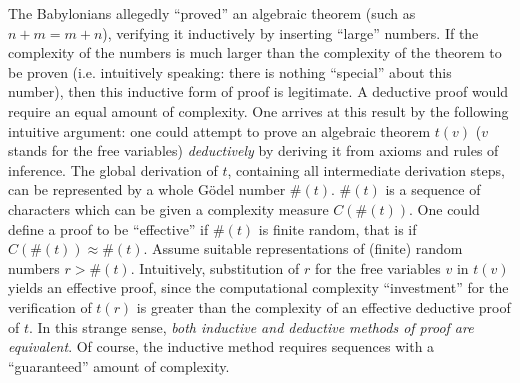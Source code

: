 \begin{thebibliography}{999}
The Babylonians allegedly ``proved'' an algebraic theorem
(such as $n+m=m+n$),
verifying it inductively by inserting ``large'' numbers.
If the complexity of the
numbers is much larger than the complexity of the theorem to be proven
(i.e. intuitively speaking: there is nothing ``special'' about
this number), then this inductive form of proof is legitimate.
A deductive proof would require an equal amount of complexity.
One arrives at this result by the
following intuitive argument:
one could attempt to prove an algebraic theorem $t(v)$ ($v$ stands for
the free variables) {\sl deductively} by deriving it from axioms and
rules of inference.
The global derivation of $t$,
containing all intermediate derivation steps,
can be represented by a whole G\"odel number $\# (t)$.
$\# (t)$ is a sequence of characters which can be given a
complexity measure $C(\# (t))$.
One could define a proof to be ``effective'' if $\# (t)$ is finite
random, that is if $C(\# (t)) \approx \# (t)$.
Assume suitable representations of (finite) random numbers $r>\# (t)$.
Intuitively, substitution of $r$ for the free variables $v$ in $t(v)$
yields an effective proof, since the computational complexity
``investment'' for the verification of $t(r)$ is greater than the
complexity of an effective deductive proof of $t$.
In this strange sense, {\sl both inductive and deductive methods
of proof are equivalent}.
Of course, the inductive method requires sequences
with a ``guaranteed'' amount of complexity.

\end{thebibliography}
      
